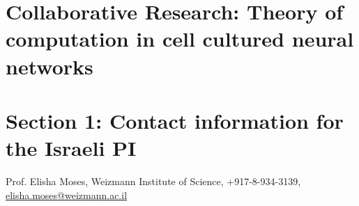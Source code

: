 \section{Collaborative Research: Theory of computation in cell cultured neural networks}
\section{Section 1: Contact information for the Israeli PI}
\noindent Prof. Elisha Moses, Weizmann Institute of Science, +917-8-934-3139, \href{mailto:elisha.moses@weizmann.ac.il}{elisha.moses@weizmann.ac.il}

